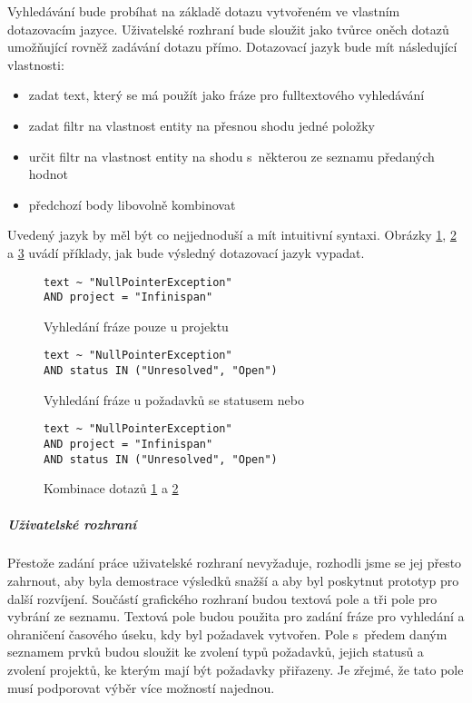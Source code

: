 \documentclass[11pt,oneside]{fithesis2}
\begin{document}
Vyhledávání bude probíhat na základě dotazu vytvořeném ve vlastním dotazovacím jazyce. Uživatelské rozhraní bude sloužit jako tvůrce oněch dotazů umožňující rovněž zadávání dotazu přímo. Dotazovací jazyk bude mít následující vlastnosti:
\begin{itemize}
	\item zadat text, který se má použít jako fráze pro fulltextového vyhledávání
	\item zadat filtr na vlastnost entity na přesnou shodu jedné položky
	\item určit filtr na vlastnost entity na shodu s~některou ze seznamu předaných hodnot
	\item předchozí body libovolně kombinovat
\end{itemize}

Uvedený jazyk by měl být co nejjednoduší a mít intuitivní syntaxi. Obrázky \ref{QueryLanguageExample1}, \ref{QueryLanguageExample2} a \ref{QueryLanguageExample3} uvádí příklady, jak bude výsledný dotazovací jazyk vypadat.

\begin{figure}[htbp]
\begin{lstlisting}[frame=single]
text ~ "NullPointerException"
AND project = "Infinispan"
\end{lstlisting}
\caption{Vyhledání fráze  pouze u projektu }
\label{QueryLanguageExample1}
\end{figure}

\begin{figure}[htbp]
\begin{lstlisting}[frame=single]
text ~ "NullPointerException" 
AND status IN ("Unresolved", "Open")
\end{lstlisting}
\caption{Vyhledání fráze  u požadavků se statusem  nebo }
\label{QueryLanguageExample2}
\end{figure}

\begin{figure}[htbp]
\begin{lstlisting}[frame=single]
text ~ "NullPointerException" 
AND project = "Infinispan" 
AND status IN ("Unresolved", "Open")
\end{lstlisting}
\caption{Kombinace dotazů \ref{QueryLanguageExample1} a \ref{QueryLanguageExample2}}
\label{QueryLanguageExample3}
\end{figure}

\subparagraph{Uživatelské rozhraní}
Přestože zadání práce uživatelské rozhraní nevyžaduje, rozhodli jsme se jej přesto zahrnout, aby byla demostrace výsledků snažší a aby byl poskytnut prototyp pro další rozvíjení. Součástí grafického rozhraní budou textová pole a tři pole pro vybrání ze seznamu. Textová pole budou použita pro zadání fráze pro vyhledání a ohraničení časového úseku, kdy byl požadavek vytvořen. Pole s~předem daným seznamem prvků budou sloužit ke zvolení typů požadavků, jejich statusů a zvolení projektů, ke kterým mají být požadavky přiřazeny. Je zřejmé, že tato pole musí podporovat výběr více možností najednou.
\end{document}
